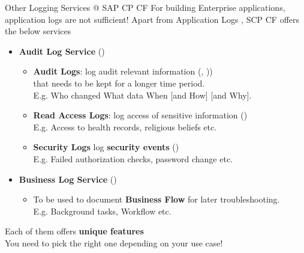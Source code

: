 \begin{frame}{Other Logging Services @ SAP CP CF}
For building Enterprise applications, application logs are not sufficient!
Apart from Application Logs , SCP CF offers the below services
\vfill
\begin{itemize}
  \item \textbf{Audit Log Service} ()
     \begin{itemize}
	    \item \textbf{Audit Logs}: log audit relevant information (, )) 
		\\that needs to be kept for a longer time period. 
		\\E.g. Who changed What data When [and How] [and Why].
        \item \textbf{Read Access Logs}: log access of sensitive information ()
		\\E.g. Access to health records, religious beliefs etc.
		\item \textbf{Security Logs} log \textbf{security events} ()
        \\E.g. Failed authorization checks, password change etc.
     \end{itemize}
  \item \textbf{Business Log Service} ()
     \begin{itemize}
        \item To be used to document \textbf{Business Flow} for later troubleshooting.
        \\E.g. Background tasks, Workflow etc.
     \end{itemize}
\end{itemize}
\vfill
Each of them offers \textbf{unique features}\\
You need to pick the right one depending on your use case!
\end{frame}